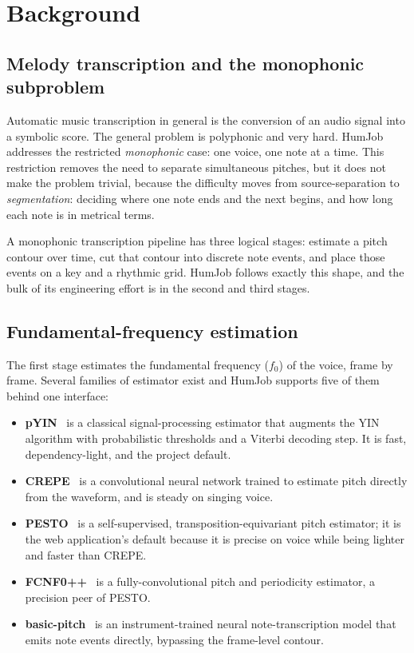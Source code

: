 \documentclass[12pt,a4paper]{article}
\begin{document}
\section{Background}

\subsection{Melody transcription and the monophonic subproblem}

Automatic music transcription in general is the conversion of an audio signal
into a symbolic score. The general problem is polyphonic and very hard. HumJob
addresses the restricted \emph{monophonic} case: one voice, one note at a time.
This restriction removes the need to separate simultaneous pitches, but it does
not make the problem trivial, because the difficulty moves from
source-separation to \emph{segmentation}: deciding where one note ends and the
next begins, and how long each note is in metrical terms.

A monophonic transcription pipeline has three logical stages: estimate a pitch
contour over time, cut that contour into discrete note events, and place those
events on a key and a rhythmic grid. HumJob follows exactly this shape, and the
bulk of its engineering effort is in the second and third stages.

\subsection{Fundamental-frequency estimation}

The first stage estimates the fundamental frequency ($f_0$) of the voice, frame
by frame. Several families of estimator exist and HumJob supports five of them
behind one interface:

\begin{itemize}
    \item \textbf{pYIN}~\cite{pyin} is a classical signal-processing estimator
    that augments the YIN algorithm with probabilistic thresholds and a Viterbi
    decoding step. It is fast, dependency-light, and the project default.
    \item \textbf{CREPE}~\cite{crepe} is a convolutional neural network trained
    to estimate pitch directly from the waveform, and is steady on singing
    voice.
    \item \textbf{PESTO}~\cite{pesto} is a self-supervised,
    transposition-equivariant pitch estimator; it is the web application's
    default because it is precise on voice while being lighter and faster than
    CREPE.
    \item \textbf{FCNF0++}~\cite{penn} is a fully-convolutional pitch and
    periodicity estimator, a precision peer of PESTO.
    \item \textbf{basic-pitch}~\cite{basicpitch} is an instrument-trained
    neural note-transcription model that emits note events directly, bypassing
    the frame-level contour.
\end{itemize}
\end{document}
